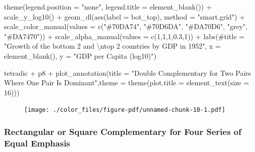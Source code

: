 \documentclass[
  letterpaper,
]{book}
\newenvironment{Shaded}{\begin{snugshade}}{\end{snugshade}}
\newcommand{\AttributeTok}[1]{\textcolor[rgb]{0.40,0.45,0.13}{#1}}
\newcommand{\CommentTok}[1]{\textcolor[rgb]{0.37,0.37,0.37}{#1}}
\newcommand{\DecValTok}[1]{\textcolor[rgb]{0.68,0.00,0.00}{#1}}
\newcommand{\FloatTok}[1]{\textcolor[rgb]{0.68,0.00,0.00}{#1}}
\newcommand{\FunctionTok}[1]{\textcolor[rgb]{0.28,0.35,0.67}{#1}}
\newcommand{\NormalTok}[1]{\textcolor[rgb]{0.00,0.23,0.31}{#1}}
\newcommand{\SpecialCharTok}[1]{\textcolor[rgb]{0.37,0.37,0.37}{#1}}
\newcommand{\StringTok}[1]{\textcolor[rgb]{0.13,0.47,0.30}{#1}}
\begin{document}
\begin{Shaded}
\begin{Highlighting}[]
  \FunctionTok{theme}\NormalTok{(}\AttributeTok{legend.position =} \StringTok{"none"}\NormalTok{, }\AttributeTok{legend.title =} \FunctionTok{element\_blank}\NormalTok{()) }\SpecialCharTok{+}
  \FunctionTok{scale\_y\_log10}\NormalTok{() }\SpecialCharTok{+}
  \FunctionTok{geom\_dl}\NormalTok{(}\FunctionTok{aes}\NormalTok{(}\AttributeTok{label =}\NormalTok{ bot\_top), }\AttributeTok{method =} \StringTok{"smart.grid"}\NormalTok{) }\SpecialCharTok{+}
  \FunctionTok{scale\_color\_manual}\NormalTok{(}\AttributeTok{values =} \FunctionTok{c}\NormalTok{(}\StringTok{"\#70DA74"}\NormalTok{, }\StringTok{"\#70D6DA"}\NormalTok{, }\StringTok{"\#DA70D6"}\NormalTok{, }\StringTok{"grey"}\NormalTok{, }\StringTok{"\#DA7470"}\NormalTok{)) }\SpecialCharTok{+}
  \FunctionTok{scale\_alpha\_manual}\NormalTok{(}\AttributeTok{values =} \FunctionTok{c}\NormalTok{(}\DecValTok{1}\NormalTok{,}\DecValTok{1}\NormalTok{,}\DecValTok{1}\NormalTok{,}\FloatTok{0.3}\NormalTok{,}\DecValTok{1}\NormalTok{)) }\SpecialCharTok{+}
  \FunctionTok{labs}\NormalTok{(}\CommentTok{\#title = "Growth of the bottom 2 and \textbackslash{}ntop 2 countries by GDP in 1952",}
       \AttributeTok{x =} \FunctionTok{element\_blank}\NormalTok{(), }\AttributeTok{y =} \StringTok{"GDP per Capita (log10)"}\NormalTok{)}


\NormalTok{tetradic }\SpecialCharTok{+}\NormalTok{ p8 }\SpecialCharTok{+} \FunctionTok{plot\_annotation}\NormalTok{(}\AttributeTok{title =} \StringTok{"Double Complementary for Two Pairs Where One Pair Is Dominant"}\NormalTok{,}\AttributeTok{theme =} \FunctionTok{theme}\NormalTok{(}\AttributeTok{plot.title =} \FunctionTok{element\_text}\NormalTok{(}\AttributeTok{size =} \DecValTok{16}\NormalTok{))) }
\end{Highlighting}
\end{Shaded}

\begin{figure}[H]

{\centering \texttt{[image: ./color\_files/figure-pdf/unnamed-chunk-10-1.pdf]}

}

\end{figure}

\hypertarget{rectangular-or-square-complementary-for-four-series-of-equal-emphasis}{%
\subsubsection{Rectangular or Square Complementary for Four Series of
Equal
Emphasis}\label{rectangular-or-square-complementary-for-four-series-of-equal-emphasis}}
\end{document}
